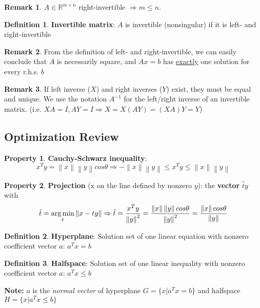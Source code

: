 \documentclass[10pt]{article}
\def\R{\mathbb{R}}
\def\imp{\Rightarrow}
\def\argmin{\mathop{\rm arg\,min}}
\theoremstyle{definition}
\newtheorem{defn}{Definition}[section]
\newtheorem{pty}{Property}[section]
\newtheorem{remark}{Remark}[section]
\newcommand{\Note}[0]{\noindent\textbf{Note: }}
\newcommand{\norm}[1]{\left\lVert#1\right\rVert} %
\begin{document}
\begin{remark}
	$A \in \R^{m\times n}$ right-invertible $\imp m \le n$.
\end{remark}

\begin{defn} \textbf{Invertible matrix}:
	$A$ is invertible (nonsingular) if it is left- and right-invertible
\end{defn}

\begin{remark}
	From the definition of left- and right-invertible,
	we can easily conclude that $A$ is necessarily square,
	and $Ax = b$ has \underline{exactly} one solution for every r.h.s. $b$
\end{remark}

\begin{remark}
	If left inverse ($X$) and right inverses ($Y$) exist, they must be equal and unique.
	We use the notation $A^{-1}$ for the left/right inverse of an invertible matrix.
	(i.e. $XA = I, AY = I \imp X = X(AY) = (XA)Y = Y$)
\end{remark}

\subsection{Optimization Review}

\begin{pty}
	\textbf{Cauchy-Schwarz inequality}:
	$$x^Ty = \norm{x}\norm{y}cos\theta \imp -\norm{x}\norm{y} \le x^Ty \le \norm{x}\norm{y}$$
\end{pty}

\begin{pty}
	\textbf{Projection} (x on the line defined by nonzero $y$): the \textbf{vector} $\hat{t}y$ with
	$$\hat{t} = \argmin\limits_{t}{\norm{x-ty}} \imp \hat{t} = \frac{x^Ty}{\norm{y}^2} = \frac{\norm{x}\norm{y}cos\theta}{\norm{y}^2} = \frac{\norm{x}cos\theta}{\norm{y}}$$
\end{pty}

\begin{defn}
	\textbf{Hyperplane}: Solution set of one linear equation with nonzero coefficient vector $a$: $a^Tx = b$
\end{defn}

\begin{defn}
	\textbf{Halfspace}: Solution set of one linear inequality with nonzero coefficient vector $a$:
	$a^Tx \le b$
\end{defn}

\Note $a$ is the \textit{normal vector} of hyperplane $G = \{x | a^Tx = b\}$ and halfspace $H = \{x | a^Tx \le b\}$\\
\end{document}
